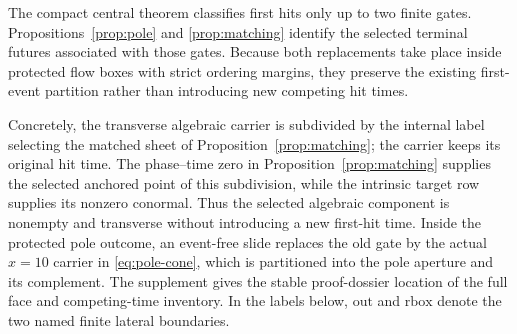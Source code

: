 \documentclass[11pt,reqno]{amsart}
\numberwithin{equation}{section}
\theoremstyle{definition}
\theoremstyle{remark}
\begin{document}
The compact central theorem classifies first hits only up to two finite gates.
Propositions~\ref{prop:pole} and \ref{prop:matching} identify the selected
terminal futures associated with those gates.  Because both replacements take place inside protected flow boxes
with strict ordering margins, they preserve the existing first-event
partition rather than introducing new competing hit times.

Concretely, the transverse algebraic carrier is subdivided by the internal
label selecting the matched sheet of Proposition~\ref{prop:matching}; the
carrier keeps its original hit time.  The phase--time zero in
Proposition~\ref{prop:matching} supplies the selected anchored point of this
subdivision, while the intrinsic target row supplies its nonzero conormal.
Thus the selected algebraic component is nonempty and transverse without
introducing a new first-hit time.  Inside the protected pole outcome, an
event-free slide replaces the old gate by the actual $x=10$ carrier in
\eqref{eq:pole-cone}, which is partitioned into the pole aperture and its
complement.  The supplement gives the stable proof-dossier location of the
full face and competing-time inventory.  In the labels below,
$\mathrm{out}$ and $\mathrm{rbox}$ denote the two named finite lateral
boundaries.
\end{document}
